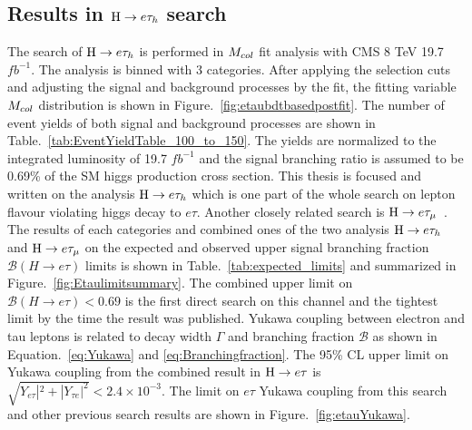 \subsection{Results in $\mathrm{H} \to e \tau_{h}$ search}
The search of $\mathrm{H} \to e \tau_{h}$ is performed in $M_{col}$ fit analysis with CMS 8 TeV 19.7 $fb^{-1}$. The analysis is binned with 3 categories. After applying the selection cuts and adjusting the signal and background processes by the fit, the fitting variable $M_{col}$ distribution is shown in Figure.~\ref{fig:etaubdtbasedpostfit}. The number of event yields of both signal and background processes are shown in Table.~\ref{tab:EventYieldTable_100_to_150}. The yields are normalized to the integrated luminosity of 19.7 $fb^{-1}$ and the signal branching ratio is assumed to be 0.69\% of the SM higgs production cross section. This thesis is focused and written on the analysis $\mathrm{H} \to e \tau_{h}$ which is one part of the whole search on lepton flavour violating higgs decay to $e\tau$. Another closely related search is $\mathrm{H} \to e \tau_{\mu}$~\cite{HIG-14-040}. The results of each categories and combined ones of the two analysis $\mathrm{H} \to e \tau_{h}$ and $\mathrm{H} \to e \tau_{\mu}$ on the expected and observed upper signal branching fraction $\mathcal{B}(H \to e \tau)$ limits is shown in Table.~\ref{tab:expected_limits} and summarized in Figure.~\ref{fig:Etaulimitsummary}.  The combined upper limit on $\mathcal{B}(H \to e \tau)<0.69$ is the first direct search on this channel and the tightest limit by the time the result was published. Yukawa coupling between electron and tau leptons is related to decay width $\Gamma$ and branching fraction $\mathcal{B}$ as shown in Equation.~\ref{eq:Yukawa} and \ref{eq:Branchingfraction}. The 95\% CL upper limit on Yukawa coupling from the combined result in $\mathrm{H} \to e \tau$ is $\sqrt{Y_{e\tau}|^2 + |Y_{\tau e}|^2}<2.4\times 10^{-3}$. The limit on $e\tau$ Yukawa coupling from this search and other previous search results are shown in Figure.~\ref{fig:etauYukawa}.









